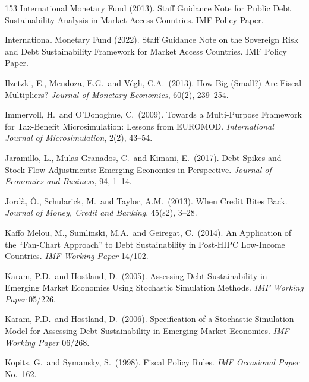 \documentclass[11pt,a4paper]{article}
\begin{document}
\begin{thebibliography}{153}
 International Monetary Fund (2013). Staff Guidance Note for Public Debt Sustainability Analysis in Market-Access Countries. IMF Policy Paper.

 International Monetary Fund (2022). Staff Guidance Note on the Sovereign Risk and Debt Sustainability Framework for Market Access Countries. IMF Policy Paper.

 Ilzetzki, E., Mendoza, E.G.\ and V\'egh, C.A.\ (2013). How Big (Small?) Are Fiscal Multipliers? \textit{Journal of Monetary Economics}, 60(2), 239--254.

 Immervoll, H.\ and O'Donoghue, C.\ (2009). Towards a Multi-Purpose Framework for Tax-Benefit Microsimulation: Lessons from EUROMOD. \textit{International Journal of Microsimulation}, 2(2), 43--54.

 Jaramillo, L., Mulas-Granados, C.\ and Kimani, E.\ (2017). Debt Spikes and Stock-Flow Adjustments: Emerging Economies in Perspective. \textit{Journal of Economics and Business}, 94, 1--14.

 Jord\`a, \`O., Schularick, M.\ and Taylor, A.M.\ (2013). When Credit Bites Back. \textit{Journal of Money, Credit and Banking}, 45(s2), 3--28.

 Kaffo Melou, M., Sumlinski, M.A.\ and Geiregat, C.\ (2014). An Application of the ``Fan-Chart Approach'' to Debt Sustainability in Post-HIPC Low-Income Countries. \textit{IMF Working Paper} 14/102.

 Karam, P.D.\ and Hostland, D.\ (2005). Assessing Debt Sustainability in Emerging Market Economies Using Stochastic Simulation Methods. \textit{IMF Working Paper} 05/226.

 Karam, P.D.\ and Hostland, D.\ (2006). Specification of a Stochastic Simulation Model for Assessing Debt Sustainability in Emerging Market Economies. \textit{IMF Working Paper} 06/268.

 Kopits, G.\ and Symansky, S.\ (1998). Fiscal Policy Rules. \textit{IMF Occasional Paper} No.\ 162.


\end{thebibliography}
\end{document}
